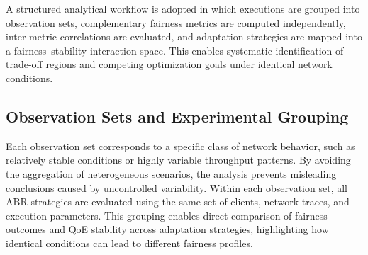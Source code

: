 \documentclass[conference,a4paper]{IEEEtran}
\begin{document}
    A structured analytical workflow is adopted in which executions are grouped into observation sets, complementary fairness metrics are computed independently, inter-metric correlations are evaluated, and adaptation strategies are mapped into a fairness--stability interaction space. This enables systematic identification of trade-off regions and competing optimization goals under identical network conditions.

    
    \subsection{Observation Sets and Experimental Grouping}
    
        Each observation set corresponds to a specific class of network behavior, such as relatively stable conditions or highly variable throughput patterns. By avoiding the aggregation of heterogeneous scenarios, the analysis prevents misleading conclusions caused by uncontrolled variability. Within each observation set, all ABR strategies are evaluated using the same set of clients, network traces, and execution parameters. This grouping enables direct comparison of fairness outcomes and QoE stability across adaptation strategies, highlighting how identical conditions can lead to different fairness profiles.
    
\end{document}
